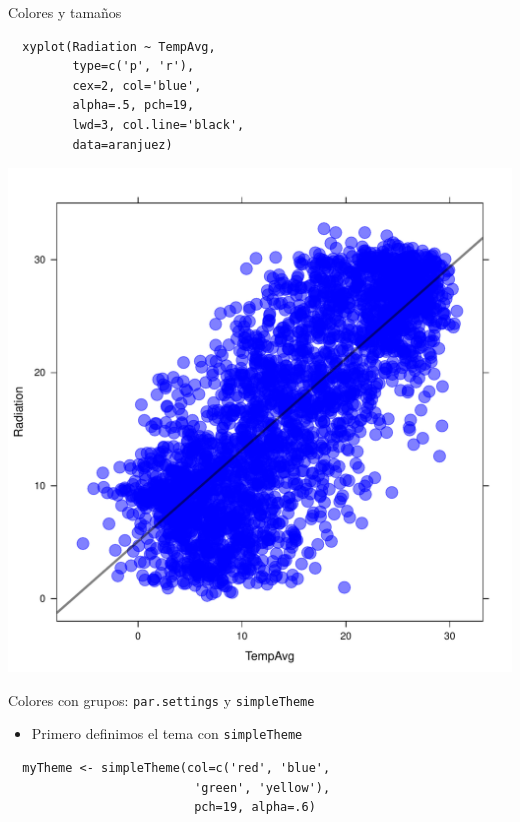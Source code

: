 \documentclass[xcolor={usenames,svgnames,dvipsnames}]{beamer}
\begin{document}
\begin{frame}[fragile,label=sec-6-2-5]{Colores y tamaños}
 \lstset{language=R,label= ,caption= ,numbers=none}
\begin{lstlisting}
  xyplot(Radiation ~ TempAvg,
         type=c('p', 'r'),
         cex=2, col='blue',
         alpha=.5, pch=19,
         lwd=3, col.line='black',
         data=aranjuez)
\end{lstlisting}
\end{frame}

\begin{frame}[label=sec-6-2-6]{}
\includegraphics[width=.9\linewidth]{figs/xyplotColors.pdf}
\end{frame}

\begin{frame}[fragile,label=sec-6-2-7]{Colores con grupos: \texttt{par.settings} y \texttt{simpleTheme}}
 \begin{itemize}
\item Primero definimos el tema con \texttt{simpleTheme}
\end{itemize}
\lstset{language=R,label= ,caption= ,numbers=none}
\begin{lstlisting}
  myTheme <- simpleTheme(col=c('red', 'blue',
                          'green', 'yellow'),
                          pch=19, alpha=.6)
\end{lstlisting}
\end{frame}
\end{document}
